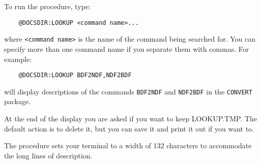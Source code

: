To run the procedure, type:
\begin{verbatim}
    @DOCSDIR:LOOKUP <command name>...
\end{verbatim}
where \verb+<command name>+ is the name of the command being searched for.
You can specify more than one command name if you separate them with commas.
For example:
\begin{verbatim}
    @DOCSDIR:LOOKUP BDF2NDF,NDF2BDF
\end{verbatim}
will display descriptions of the commands {\tt BDF2NDF} and {\tt NDF2BDF} in
the {\tt CONVERT} package.

At the end of the display you are asked if you want to keep LOOKUP.TMP.
The default action is to delete it, but you can save it and print it out if
you want to.

The procedure sets your terminal to a width of 132 characters to accommodate
the long lines of description.


